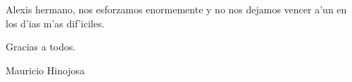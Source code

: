 Alexis hermano, nos esforzamos enormemente y no nos dejamos vencer a'un en los d'ias m'as dif'iciles. 

Gracias a todos.
\vspace{0.5cm}
\begin{flushright}
Mauricio Hinojosa
\end{flushright}




